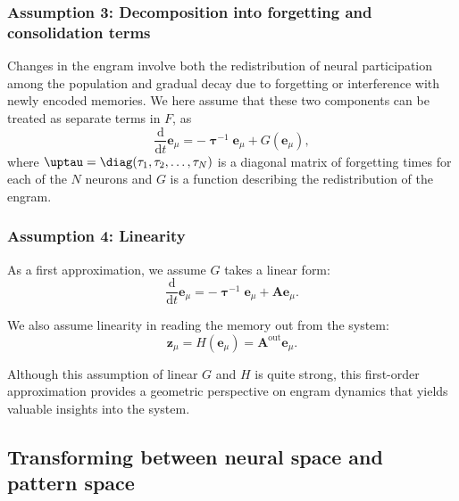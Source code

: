 \subsubsection*{Assumption 3: Decomposition into forgetting and consolidation terms}

Changes in the engram involve both the redistribution of neural participation among the population and gradual decay due to forgetting or interference with newly encoded memories. We here assume that these two components can be treated as separate terms in $F$, as
%
\begin{equation}\label{eq:forgetting_dynamics}
  \frac{\mathrm{d}}{\mathrm{d}t} \mathbf{e}_\mu = -\boldsymbol{\uptau}^{-1} \mathbf{e}_\mu + G(\mathbf{e}_\mu),
\end{equation}
%
where $\boldsymbol{\uptau} = \diag(\tau_1,\tau_2,\ldots, \tau_N)$ is a diagonal matrix of forgetting times for each of the $N$ neurons and $G$ is a function describing the redistribution of the engram.

\subsubsection*{Assumption 4: Linearity}

As a first approximation, we assume $G$ takes a linear form:
%
\begin{equation}
  \frac{\mathrm{d}}{\mathrm{d}t} \mathbf{e}_\mu = -\boldsymbol{\uptau}^{-1} \mathbf{e}_\mu + \mathbf{A} \mathbf{e}_\mu.
\end{equation}

We also assume linearity in reading the memory out from the system:
%
\begin{equation}
  \mathbf{z}_\mu = H(\mathbf{e}_\mu) = \mathbf{A}^{\text{out}} \mathbf{e}_\mu.
\end{equation}
%

Although this assumption of linear $G$ and $H$ is quite strong, this first-order approximation provides a geometric perspective on engram dynamics that yields valuable insights into the system.

\subsection{Transforming between neural space and pattern space}
\label{sub:pattern-space}

